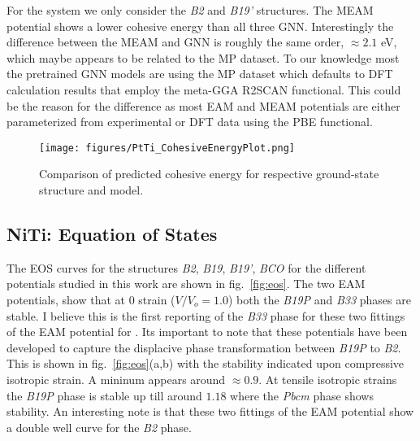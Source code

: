 \documentclass[preprint,colorlinks=true,linkcolor=black,citecolor=black]{elsarticle}
\begin{document}
For the  system we only consider the \textit{B2} and
\textit{B19'} structures. The MEAM potential shows a lower cohesive
energy than all three GNN. Interestingly the difference between the
MEAM and GNN is roughly the same order, $\approx 2.1$ eV, which maybe
appears to be related to the MP dataset. To our knowledge most the
pretrained GNN models are using the MP dataset which defaults to DFT
calculation results that employ the meta-GGA R2SCAN functional. This
could be the reason for the difference as most EAM and MEAM potentials
are either parameterized from experimental or DFT data using the PBE
functional\cite{Mutter2010,Ko2015}. \par

\begin{figure}[ht!]
  \begin{centering}
    \texttt{[image: figures/PtTi\_CohesiveEnergyPlot.png]}
    \caption{ Comparison of predicted  cohesive energy for
      respective ground-state structure and model.  }
    \label{fig:ecoh_ptti}
  \end{centering}
\end{figure}

\subsection{NiTi: Equation of States}
\label{subsec:nitieos}

The EOS curves for the  structures \textit{B2}, \textit{B19},
\textit{B19'}, \textit{BCO} for the different potentials studied in
this work are shown in fig.~\ref{fig:eos}. The two EAM potentials,
show that at 0 strain ($V/V_o = 1.0$) both the \textit{B19P} and
\textit{B33} phases are stable. I believe this is the first reporting
of the \textit{B33} phase for these two fittings of the EAM potential
for . Its important to note that these potentials have been
developed to capture the displacive phase transformation between
\textit{B19P} to \textit{B2}. This is shown in fig.~\ref{fig:eos}(a,b)
with the stability indicated upon compressive isotropic strain. A
mininum appears around $\approx 0.9$. At tensile isotropic strains the
\textit{B19P} phase is stable up till around $1.18$ where the
\textit{Pbcm} phase shows stability. An interesting note is that these
two fittings of the EAM potential show a double well curve for the
\textit{B2} phase. \par
\end{document}
